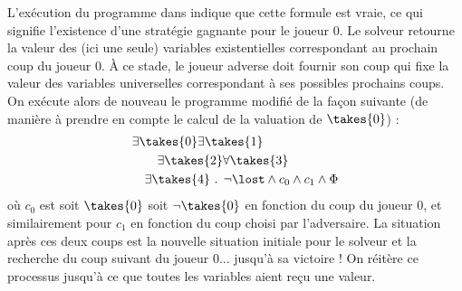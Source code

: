 
L'exécution du programme dans \touist indique que cette formule est vraie, ce qui signifie l'existence d'une stratégie gagnante pour le joueur $0$. Le solveur retourne la valeur des (ici une seule) variables existentielles correspondant au prochain coup du joueur $0$. À ce stade, le joueur adverse doit fournir son coup qui fixe la valeur des variables universelles correspondant à ses possibles prochains coups. On exécute alors de nouveau le programme modifié de la façon suivante (de manière à prendre en compte le calcul de la valuation de $\takes{0}$) :
\begin{align*}
\begin{split}
&\exists \takes{0}
\exists \takes{1}\\
&\qquad\exists \takes{2}
\forall \takes{3} \\
&\quad\exists \takes{4}\text{ . }\neg \lost \land c_0 \land c_1 \land  \Phi
\end{split}
\end{align*}
où $c_0$ est soit $\takes{0}$ soit $\neg \takes{0}$ en fonction du coup du joueur $0$, et similairement pour $c_1$ en fonction du coup choisi par l'adversaire. La  situation après ces deux coups est la nouvelle situation initiale pour le solveur et la recherche du coup suivant du joueur $0$... jusqu'à sa victoire ! On réitère ce processus jusqu'à ce que toutes les variables aient reçu une valeur. 
